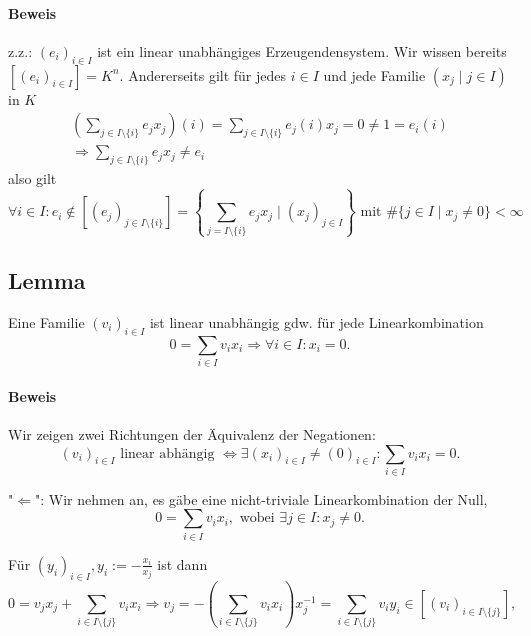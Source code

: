 \paragraph{Beweis}
	z.z.: $ (e_i)_{i\in I} $ ist ein linear unabhängiges Erzeugendensystem. Wir wissen bereits $ [(e_i)_{i\in I}] = K^n $. Andererseits gilt für jedes $i\in I$ und jede Familie $(x_j\mid j\in I)$ in $ K $
	\begin{gather*}
		\left(\sum_{j\in I\setminus\{i\}}e_jx_j\right)(i) = \sum_{j\in I\setminus\{i\}}e_j(i)x_j = 0 \neq 1 = e_i(i)\\
		\Rightarrow \sum_{j\in I\setminus\{i\}} e_jx_j \neq e_i
	\end{gather*}
	also gilt
	\begin{equation*}
		\forall i\in I: e_i \notin [(e_j)_{j\in I\setminus\{i\}}] = \left\{\sum_{j=I\setminus\{i\}} e_jx_j\mid (x_j)_{ j\in I}\right\} \text{ mit } \#\{j\in I\mid x_j \neq 0\}<\infty
	\end{equation*}
	
\subsection{Lemma}
	\begin{Lemma}
		Eine Familie $(v_i)_{i\in I}$ ist linear unabhängig gdw. für jede Linearkombination
	\begin{equation*}
		0 = \sum_{i\in I} v_ix_i \Rightarrow \forall i\in I: x_i = 0.
	\end{equation*}
	\end{Lemma}

\paragraph{Beweis}
	Wir zeigen zwei Richtungen der Äquivalenz der Negationen: 
	\begin{equation*}
		(v_i)_{i\in I} \text{ linear abhängig } \Leftrightarrow \exists(x_i)_{i\in I} \neq (0)_{i\in I}: \sum_{i\in I} v_ix_i = 0.
	\end{equation*}

	"$\Leftarrow$":
	Wir nehmen an, es gäbe eine nicht-triviale Linearkombination der Null,
	\begin{equation*}
		0 = \sum_{i\in I} v_ix_i, \text{ wobei } \exists j\in I: x_j \neq 0.
	\end{equation*}

	Für $(y_i)_{i\in I}, y_i := - \frac{x_i}{x_j}$ ist dann
	\begin{equation*}
		0 = v_jx_j + \sum_{i\in I\setminus\{j\}} v_ix_i \Rightarrow v_j = -\left(\sum_{i\in I\setminus\{j\}}v_ix_i\right)x_j^{-1} = \sum_{i\in I\setminus\{j\}} v_iy_i \in [(v_i)_{i\in I\setminus\{j\}}],
	\end{equation*}

